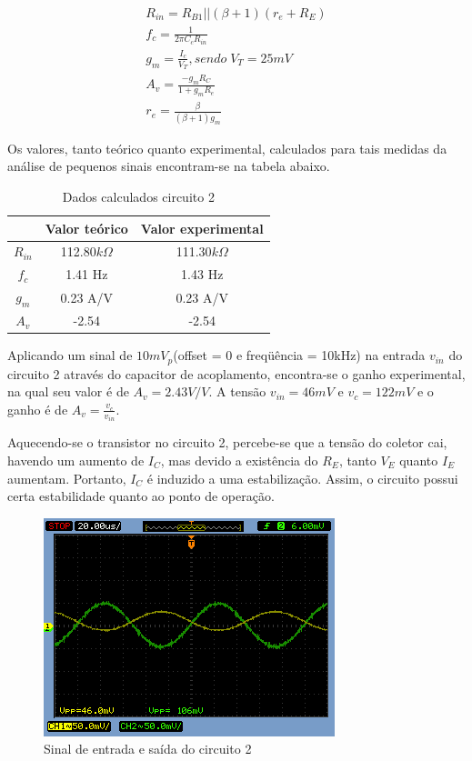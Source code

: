 \documentclass[a4paper]{article} %
\begin{document}
\begin{eqnarray}
R_{in}=R_{B1}||(\beta+1)(r_{e}+R_E)\\
f_c=\frac{1}{2\pi C_cR_{in}}\\
g_m=\frac{I_c}{V_T},sendo \; V_T = 25 mV\\
A_v=\frac{-g_mR_C}{1+g_mR_e}\\
r_{e}=\frac{\beta}{(\beta+1)g_m}
\end{eqnarray}

Os valores, tanto teórico quanto experimental, calculados para tais medidas da análise
de pequenos sinais encontram-se na tabela abaixo.

\begin{table}[h!]
\begin{centering}
\begin{tabular}{ccc}
\hline 
 & Valor teórico & Valor experimental\tabularnewline
\hline
\hline 
$R_{in}$ & 112.80$k\Omega$ & 111.30$k\Omega$\tabularnewline
$f_{c}$ & 1.41 Hz & 1.43 Hz\tabularnewline
$g_{m}$ & 0.23 A/V & 0.23 A/V\tabularnewline
$A_{v}$ & -2.54 & -2.54\tabularnewline
\hline
\end{tabular}
\par\end{centering}

\caption{Dados calculados circuito 2}

\end{table}
%
Aplicando um sinal de $10mV_p$(offset = 0 e freqüência = 10kHz) na entrada $v_{in}$
do circuito 2 através do capacitor de acoplamento, encontra-se o ganho experimental, na qual seu
valor é de $A_v=2.43V/V$. A tensão $v_{in}=46mV$ e $v_c=122mV$ e o ganho é de  $A_v=\frac{v_c}{v_{in}}$.

Aquecendo-se o transistor no circuito 2, percebe-se que a tensão do coletor
cai, havendo um aumento de $I_C$, mas devido a existência do $R_E$, tanto $V_E$ quanto $I_E$ aumentam. Portanto, $I_C$ é induzido a uma estabilização.
Assim, o circuito possui certa estabilidade quanto ao ponto de operação.

\begin{figure}[h!]
\begin{centering}
\includegraphics[scale=0.5]{figuras03/3} \caption{Sinal de entrada e saída do circuito 2 \label{fig:3}}
\par\end{centering}
\end{figure}
\end{document}
